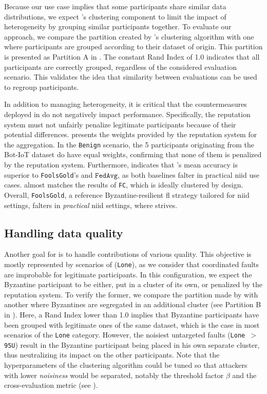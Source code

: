 Because our use case implies that some participants share similar data distributions, we expect \thecontrib's clustering component to limit the impact of heterogeneity by grouping similar participants together.
To evaluate our approach, we compare the partition created by \thecontrib's clustering algorithm with one where participants are grouped according to their dataset of origin.
This partition is presented as Partition A in .
The constant Rand Index of 1.0 indicates that all participants are correctly grouped, regardless of the considered evaluation scenario.
This validates the idea that similarity between evaluations can be used to regroup participants. 

In addition to managing heterogeneity, it is critical that the countermeasures deployed in \thecontrib do not negatively impact performance.
Specifically, the reputation system must not unfairly penalize legitimate participants because of their potential differences.
 presents the weights provided by the reputation system for the aggregation. 
In the \texttt{Benign} scenario, the 5 participants originating from the Bot-IoT dataset do have equal weights, confirming that none of them is penalized by the reputation system.
Furthermore,  indicates that \thecontrib's mean accuracy is superior to \texttt{FoolsGold}'s and $\texttt{FedAvg}$, as both baselines falter in practical \gls{niid} use cases.
\thecontrib almost matches the results of \texttt{FC}, which is ideally clustered by design.
Overall, \texttt{FoolsGold}, a reference Byzantine-resilient \gls{fl} strategy tailored for \gls{niid} settings, falters in \emph{practical} \gls{niid} settings, where \thecontrib strives.


\subsection{Handling data quality\label{sec:radar.results.quality}}

Another goal for \thecontrib is to handle contributions of various quality.
This objective is mostly represented by scenarios of  (\texttt{Lone}), as we consider that coordinated faults are improbable for legitimate participants.
In this configuration, we expect the Byzantine participant to be either, put in a cluster of its own, or penalized by the reputation system.
To verify the former, we compare the partition made by \thecontrib with another where Byzantines are segregated in an additional cluster (see Partition B in ).
Here, a Rand Index lower than 1.0 implies that Byzantine participants have been grouped with legitimate ones of the same dataset, which is the case in most scenarios of the \texttt{Lone} category.
However, the noisiest untargeted faults (\texttt{Lone~$>$95U}) result in the Byzantine participant being placed in his own separate cluster, thus neutralizing its impact on the other participants.
Note that the hyperparameters of the clustering algorithm could be tuned so that attackers with lower \emph{noisiness} would be separated, notably the threshold factor $\beta$ and the cross-evaluation metric (see ).

